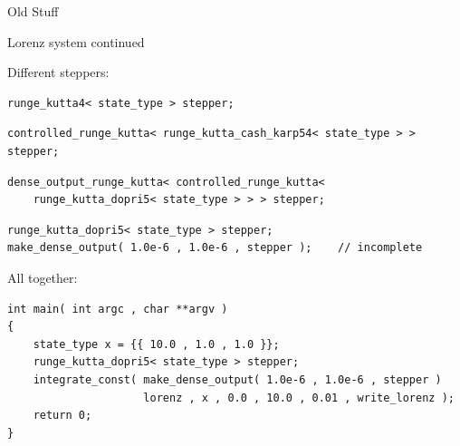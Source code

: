 \begin{frame}
 \centerline{\Large Old Stuff}
\end{frame}




\begin{frame}[fragile]{Lorenz system continued}

  Different steppers:

  \begin{lstlisting}
runge_kutta4< state_type > stepper;
  \end{lstlisting}

  \pause
  
  \begin{lstlisting}
controlled_runge_kutta< runge_kutta_cash_karp54< state_type > > stepper;
  \end{lstlisting}

  \pause

  \begin{lstlisting}
dense_output_runge_kutta< controlled_runge_kutta<
    runge_kutta_dopri5< state_type > > > stepper;
  \end{lstlisting}

  \pause

  \begin{lstlisting}
runge_kutta_dopri5< state_type > stepper;
make_dense_output( 1.0e-6 , 1.0e-6 , stepper );    // incomplete
  \end{lstlisting}

  \pause

  All together:

  \begin{lstlisting}
int main( int argc , char **argv )
{
    state_type x = {{ 10.0 , 1.0 , 1.0 }};
    runge_kutta_dopri5< state_type > stepper;
    integrate_const( make_dense_output( 1.0e-6 , 1.0e-6 , stepper )
                     lorenz , x , 0.0 , 10.0 , 0.01 , write_lorenz );
    return 0;
}
  \end{lstlisting}



  
\end{frame}

